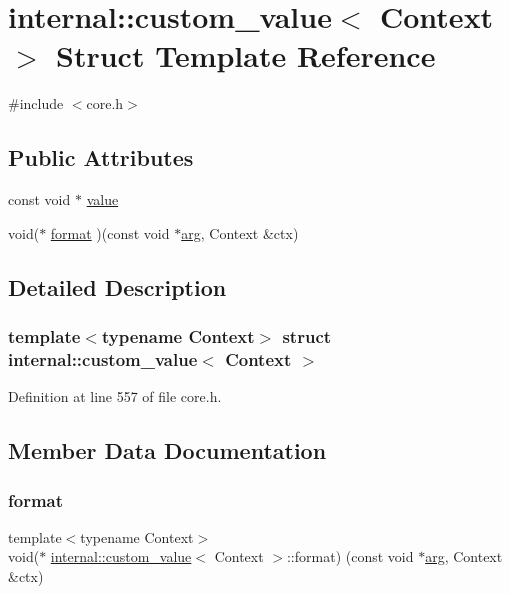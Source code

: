 \hypertarget{structinternal_1_1custom__value}{}\section{internal\+:\+:custom\+\_\+value$<$ Context $>$ Struct Template Reference}
\label{structinternal_1_1custom__value}


{\ttfamily \#include $<$core.\+h$>$}

\subsection*{Public Attributes}
\begin{DoxyCompactItemize}
\item 
const void $\ast$ \hyperlink{structinternal_1_1custom__value_ae709a1d791335ff50d6f3ac36bd57a34}{value}
\item 
void($\ast$ \hyperlink{structinternal_1_1custom__value_a1b66904a8559dc607d0f5b38971bfde9}{format} )(const void $\ast$\hyperlink{core_8h_ab87859023d64d26171b1e74a3d0c3b99}{arg}, Context \&ctx)
\end{DoxyCompactItemize}


\subsection{Detailed Description}
\subsubsection*{template$<$typename Context$>$\newline
struct internal\+::custom\+\_\+value$<$ Context $>$}



Definition at line 557 of file core.\+h.



\subsection{Member Data Documentation}
\mbox{\label{structinternal_1_1custom__value_a1b66904a8559dc607d0f5b38971bfde9}} 
\subsubsection{\texorpdfstring{format}{format}}
{\footnotesize\ttfamily template$<$typename Context$>$ \\
void($\ast$ \hyperlink{structinternal_1_1custom__value}{internal\+::custom\+\_\+value}$<$ Context $>$\+::format) (const void $\ast$\hyperlink{core_8h_ab87859023d64d26171b1e74a3d0c3b99}{arg}, Context \&ctx)}



